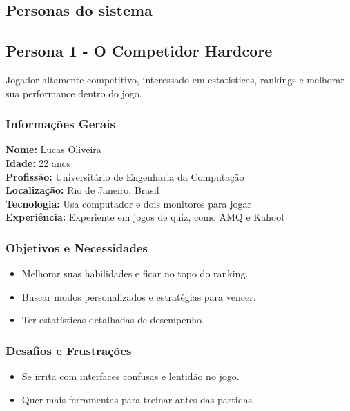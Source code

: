 \begin{titlepage}
    \section{Personas do sistema}
    \subsection{Persona 1 - O Competidor Hardcore}
    Jogador altamente competitivo, interessado em estatísticas, rankings e melhorar sua performance dentro do jogo.
    
    \subsubsection{Informações Gerais}
        \textbf{Nome:} Lucas Oliveira\\
        \textbf{Idade:} 22 anos\\
        \textbf{Profissão:} Universitário de Engenharia da Computação\\
        \textbf{Localização:} Rio de Janeiro, Brasil\\
        \textbf{Tecnologia:} Usa computador e dois monitores para jogar\\
        \textbf{Experiência:} Experiente em jogos de quiz, como AMQ e Kahoot\\

    \subsubsection{Objetivos e Necessidades}
        \begin{itemize}
            \item Melhorar suas habilidades e ficar no topo do ranking.
            \item Buscar modos personalizados e estratégias para vencer.
            \item Ter estatísticas detalhadas de desempenho.
        \end{itemize}

    \subsubsection{Desafios e Frustrações}
        \begin{itemize}
            \item Se irrita com interfaces confusas e lentidão no jogo.
            \item Quer mais ferramentas para treinar antes das partidas.
        \end{itemize}


\end{titlepage}
